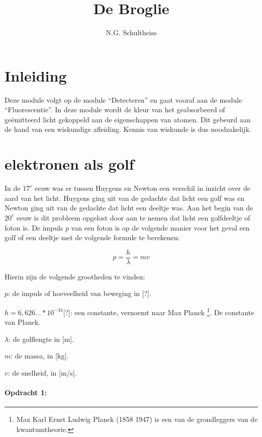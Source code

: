 



\title{De Broglie}
\author{N.G. Schultheiss}
\date{}

\maketitle
\thispagestyle{firststyle}

\section{Inleiding}

Deze module volgt op de module ``Detecteren'' en gaat vooraf aan
de module ``Fluorescentie''. In deze module wordt de kleur van het
geabsorbeerd of geëmitteerd licht gekoppeld aan de eigenschappen van
atomen. Dit gebeurd aan de hand van een wiskundige afleiding. Kennis
van wiskunde is dus noodzakelijk.


\section{elektronen als golf}

In de $17^{e}$ eeuw was er tussen Huygens en Newton een verschil
in inzicht over de aard van het licht. Huygens ging uit van de gedachte
dat licht een golf was en Newton ging uit van de gedachte dat licht
een deeltje was. Aan het begin van de $20^{e}$ eeuw is dit probleem
opgelost door aan te nemen dat licht een golfdeeltje of foton is.
De impuls $p$ van een foton is op de volgende manier voor het geval
een golf of een deeltje met de volgende formule te berekenen:

\begin{equation}
p=\frac{h}{\lambda}=mv
\end{equation}


Hierin zijn de volgende grootheden te vinden:

$p$: de impuls of hoeveelheid van beweging in {[}?{]}.

$h=6,626...*10^{-34}${[}?{]}: een constante, vernoemt naar Max Planck
\footnote{Max Karl Ernst Ludwig Planck (1858 \textendash{} 1947) is een
van de grondleggers van de kwantumtheorie.}. De constante van Planck.

$\lambda$: de golflengte in {[}m{]}.

$m$: de massa, in {[}kg{]}.

$v$: de snelheid, in {[}m/s{]}.


\paragraph*{Opdracht 1:}


